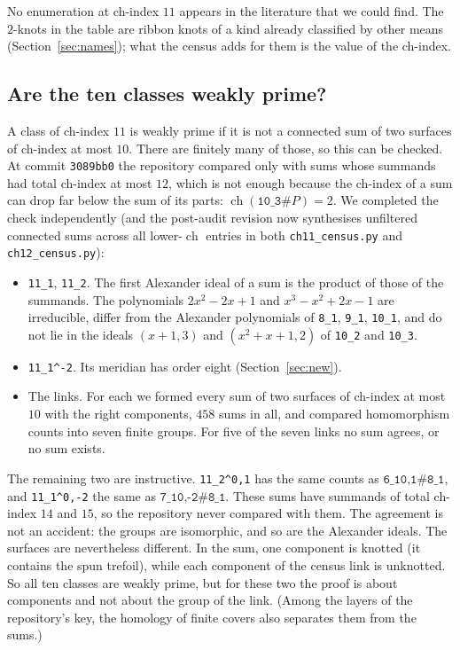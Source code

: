 \documentclass[11pt]{amsart}
\newcommand{\ch}{\operatorname{ch}}
\newcommand{\lab}[1]{\texttt{#1}}
\newcommand{\file}[1]{\texttt{#1}}
\theoremstyle{plain}
\theoremstyle{remark}
\begin{document}
No enumeration at ch-index $11$ appears in the literature that we could find. The $2$-knots in the table
are ribbon knots of a kind already classified by other means (Section~\ref{sec:names}); what the
census adds for them is the value of the ch-index.

\subsection{Are the ten classes weakly prime?}\label{sec:weak}

A class of ch-index $11$ is weakly prime if it is not a connected sum of two surfaces of ch-index at most
$10$. There are finitely many of those, so this can be checked. At commit \texttt{3089bb0} the repository
compared only with sums whose summands had total ch-index at most $12$, which is not enough because the
ch-index of a sum can drop far below the sum of its parts: $\ch(\lab{10\_3}\#P)=2$. We completed the check
independently (and the post-audit revision now synthesises unfiltered connected sums across all lower-$\ch$
entries in both \file{ch11\_census.py} and \file{ch12\_census.py}):

\begin{itemize}[leftmargin=*]
\item \lab{11\_1}, \lab{11\_2}. The first Alexander ideal of a sum is the product of those of the
summands. The polynomials $2x^2-2x+1$ and $x^3-x^2+2x-1$ are irreducible, differ from the Alexander
polynomials of \lab{8\_1}, \lab{9\_1}, \lab{10\_1}, and do not lie in the ideals $(x+1,3)$ and
$(x^2+x+1,2)$ of \lab{10\_2} and \lab{10\_3}.
\item \lab{11\_1\^{}-2}. Its meridian has order eight (Section~\ref{sec:new}).
\item The links. For each we formed every sum of two surfaces of ch-index at most $10$ with the right
components, $458$ sums in all, and compared homomorphism counts into seven finite groups. For five of
the seven links no sum agrees, or no sum exists.
\end{itemize}

The remaining two are instructive. \lab{11\_2\^{}0,1} has the same counts as
$\lab{6\_1\^{}0,1}\#\lab{8\_1}$, and \lab{11\_1\^{}0,-2} the same as
$\lab{7\_1\^{}0,-2}\#\lab{8\_1}$. These sums have summands of total ch-index $14$ and $15$, so the
repository never compared with them. The agreement is not an accident: the groups are isomorphic, and so
are the Alexander ideals. The surfaces are nevertheless different. In the sum, one component is knotted
(it contains the spun trefoil), while each component of the census link is unknotted. So all ten classes
are weakly prime, but for these two the proof is about components and not about the group of the link.
(Among the layers of the repository's key, the homology of finite covers also separates them from the sums.)
\end{document}
